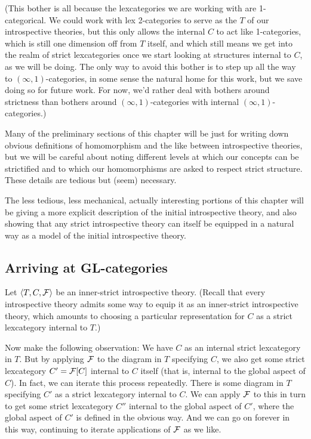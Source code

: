 (This bother is all because the lexcategories we are working with are 1-categorical. We could work with lex 2-categories to serve as the $T$ of our introspective theories, but this only allows the internal $C$ to act like 1-categories, which is still one dimension off from $T$ itself, and which still means we get into the realm of strict lexcategories once we start looking at structures internal to $C$, as we will be doing. The only way to avoid this bother is to step up all the way to $(\infty, 1)$-categories, in some sense the natural home for this work, but we save doing so for future work. For now, we'd rather deal with bothers around strictness than bothers around $(\infty, 1)$-categories with internal $(\infty, 1)$-categories.)

Many of the preliminary sections of this chapter will be just for writing down obvious definitions of homomorphism and the like between introspective theories, but we will be careful about noting different levels at which our concepts can be strictified and to which our homomorphisms are asked to respect strict structure. These details are tedious but (seem) necessary.

The less tedious, less mechanical, actually interesting portions of this chapter will be giving a more explicit description of the initial introspective theory, and also showing that any strict introspective theory can itself be equipped in a natural way as a model of the initial introspective theory.


\subsection{Arriving at GL-categories}
Let $\langle T, C, \mathcal{F}\rangle$ be an inner-strict introspective theory. (Recall that every introspective theory admits some way to equip it as an inner-strict introspective theory, which amounts to choosing a particular representation for $C$ as a strict lexcategory internal to $T$.)

Now make the following observation: We have $C$ as an internal strict lexcategory in $T$. But by applying $\mathcal{F}$ to the diagram in $T$ specifying $C$, we also get some strict lexcategory $C' = \mathcal{F}[C]$ internal to $C$ itself (that is, internal to the global aspect of $C$). In fact, we can iterate this process repeatedly. There is some diagram in $T$ specifying $C'$ as a strict lexcategory internal to $C$. We can apply $\mathcal{F}$ to this in turn to get some strict lexcategory $C''$ internal to the global aspect of $C'$, where the global aspect of $C'$ is defined in the \TODO obvious way. And we can go on forever in this way, continuing to iterate applications of $\mathcal{F}$ as we like. \TODO

